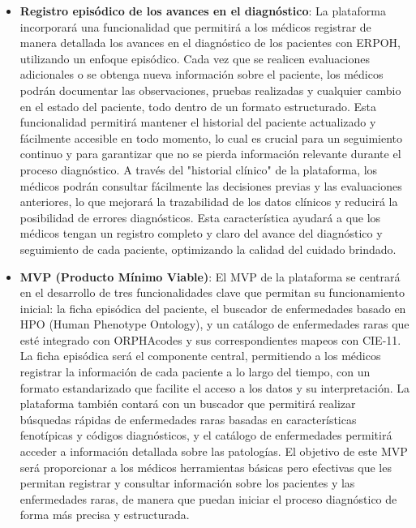 \documentclass{article}
\begin{document}
\begin{itemize}[leftmargin=1.2em]
\item \textbf{Registro episódico de los avances en el diagnóstico}:
La plataforma incorporará una funcionalidad que permitirá a los médicos registrar de manera detallada los avances en el diagnóstico de los pacientes con ERPOH, utilizando un enfoque episódico. Cada vez que se realicen evaluaciones adicionales o se obtenga nueva información sobre el paciente, los médicos podrán documentar las observaciones, pruebas realizadas y cualquier cambio en el estado del paciente, todo dentro de un formato estructurado. Esta funcionalidad permitirá mantener el historial del paciente actualizado y fácilmente accesible en todo momento, lo cual es crucial para un seguimiento continuo y para garantizar que no se pierda información relevante durante el proceso diagnóstico. A través del "historial clínico" de la plataforma, los médicos podrán consultar fácilmente las decisiones previas y las evaluaciones anteriores, lo que mejorará la trazabilidad de los datos clínicos y reducirá la posibilidad de errores diagnósticos. Esta característica ayudará a que los médicos tengan un registro completo y claro del avance del diagnóstico y seguimiento de cada paciente, optimizando la calidad del cuidado brindado.

\item \textbf{MVP (Producto Mínimo Viable)}:
El MVP de la plataforma se centrará en el desarrollo de tres funcionalidades clave que permitan su funcionamiento inicial: la ficha episódica del paciente, el buscador de enfermedades basado en HPO (Human Phenotype Ontology), y un catálogo de enfermedades raras que esté integrado con ORPHAcodes y sus correspondientes mapeos con CIE-11. La ficha episódica será el componente central, permitiendo a los médicos registrar la información de cada paciente a lo largo del tiempo, con un formato estandarizado que facilite el acceso a los datos y su interpretación. La plataforma también contará con un buscador que permitirá realizar búsquedas rápidas de enfermedades raras basadas en características fenotípicas y códigos diagnósticos, y el catálogo de enfermedades permitirá acceder a información detallada sobre las patologías. El objetivo de este MVP será proporcionar a los médicos herramientas básicas pero efectivas que les permitan registrar y consultar información sobre los pacientes y las enfermedades raras, de manera que puedan iniciar el proceso diagnóstico de forma más precisa y estructurada.


\end{itemize}
\end{document}
